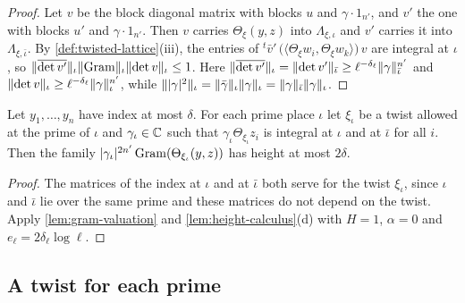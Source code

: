 \begin{proof}
Let $v$ be the block diagonal matrix with blocks $u$ and $\gamma\cdot1_{n'}$, and $v'$ the one with
blocks $u'$ and $\gamma\cdot1_{n'}$. Then $v$ carries $\Theta_\xi(y,z)$ into $\Lambda_{\xi,\iota}$
and $v'$ carries it into $\Lambda_{\xi,\bar\iota}$. By \cref{def:twisted-lattice}(iii), the entries of
${}^t\bar v'\,\bigl(\langle\Theta_\xi w_i,\Theta_\xi w_k\rangle\bigr)\,v$ are integral at $\iota$, so
$\lVert \overline{\det v'}\rVert_\iota\lVert \operatorname{Gram}\rVert_\iota\lVert \det v\rVert_\iota\le1$. Here
$\lVert \overline{\det v'}\rVert_\iota=\lVert \det v'\rVert_{\bar\iota}\ge\ell^{-\delta_\ell}\lVert \gamma\rVert^{n'}_{\bar\iota}$
and $\lVert \det v\rVert_\iota\ge\ell^{-\delta_\ell}\lVert \gamma\rVert^{n'}_\iota$, while
$\lVert \lvert \gamma\rvert^2\rVert_\iota=\lVert \bar\gamma\rVert_\iota\lVert \gamma\rVert_\iota
=\lVert \gamma\rVert_{\bar\iota}\lVert \gamma\rVert_\iota$.
\end{proof}

\begin{corollary}\label{cor:height-gram}
Let $y_1,\dots,y_n$ have index at most $\delta$. For each prime place $\iota$ let $\xi_\iota$ be a
twist allowed at the prime of $\iota$ and $\gamma_\iota\in\mathbb{C}$ such that $\gamma_\iota\Theta_{\xi_\iota}
z_i$ is integral at $\iota$ and at $\bar\iota$ for all $i$. Then the family
$\lvert \gamma_\iota\rvert^{2n'}\operatorname{Gram}(\Theta_{\xi_\iota}(y,z))$ has height at most $2\delta$.
\end{corollary}

\begin{proof}
The matrices of the index at $\iota$ and at $\bar\iota$ both serve for the twist $\xi_\iota$, since
$\iota$ and $\bar\iota$ lie over the same prime and these matrices do not depend on the twist. Apply
\cref{lem:gram-valuation} and \cref{lem:height-calculus}(d) with $H=1$, $\alpha=0$ and
$e_\ell=2\delta_\ell\log\ell$.
\end{proof}

\subsection{A twist for each prime}\label{ss:twist-for-each-prime}

